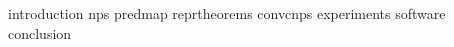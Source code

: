 \documentclass[12pt]{report}
\begin{document}
{introduction}
{nps}
{predmap}
{reprtheorems}
{convcnps}
{experiments}
{software}
{conclusion}
\end{document}
